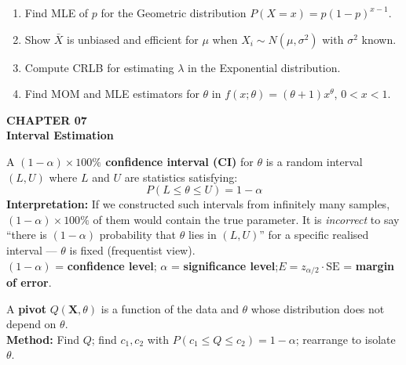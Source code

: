 \documentclass[12pt]{article}
\begin{document}
\begin{practicebox}
\begin{enumerate}[label=\textbf{Q\arabic*.},noitemsep]
  \item Find MLE of $p$ for the Geometric distribution $P(X=x)=p(1-p)^{x-1}$.
  \item Show $\bar X$ is unbiased and efficient for $\mu$ when $X_i\sim N(\mu,\sigma^2)$ with $\sigma^2$ known.
  \item Compute CRLB for estimating $\lambda$ in the Exponential distribution.
  \item Find MOM and MLE estimators for $\theta$ in $f(x;\theta)=(\theta+1)x^\theta$, $0<x<1$.
\end{enumerate}
\end{practicebox}

\newpage

\begin{tcolorbox}[enhanced,arc=0pt,boxrule=0pt,colback=primary,colframe=primary,
  left=16pt,right=16pt,top=14pt,bottom=10pt,borderline south={4pt}{0pt}{accent}]
  {\color{accent!70}\small\bfseries CHAPTER 07}\\[4pt]
  {\LARGE\bfseries\color{white}Interval Estimation}
\end{tcolorbox}
\vspace{10pt}

\begin{defbox}
A \textbf{$(1-\alpha)\times100\%$ confidence interval (CI)} for $\theta$ is a random interval $(L,U)$ where $L$ and $U$ are statistics satisfying:
\[P(L\leq\theta\leq U)=1-\alpha\]
\textbf{Interpretation:} If we constructed such intervals from infinitely many samples, $(1-\alpha)\times100\%$ of them would contain the true parameter. It is \textit{incorrect} to say ``there is $(1-\alpha)$ probability that $\theta$ lies in $(L,U)$'' for a specific realised interval --- $\theta$ is fixed (frequentist view).\\[4pt]
$(1-\alpha)$ = \textbf{confidence level}; \quad $\alpha$ = \textbf{significance level};\quad $E=z_{\alpha/2}\cdot\text{SE}$ = \textbf{margin of error}.
\end{defbox}

\begin{defbox}
A \textbf{pivot} $Q(\mathbf X,\theta)$ is a function of the data and $\theta$ whose distribution does not depend on $\theta$.\\[4pt]
\textbf{Method:} Find $Q$; find $c_1,c_2$ with $P(c_1\leq Q\leq c_2)=1-\alpha$; rearrange to isolate $\theta$.
\end{defbox}
\end{document}

